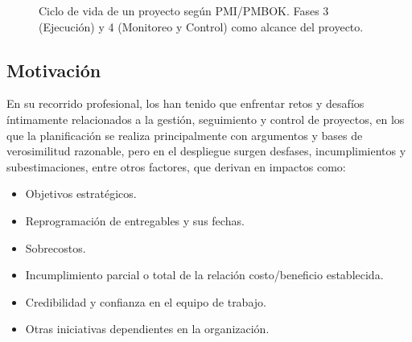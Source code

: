 \documentclass[12pt]
{charter}
\begin{document}
\begin{figure}[h]
  \centering


  \caption{Ciclo de vida de un proyecto según PMI/PMBOK. Fases 3 (Ejecución) y 4 (Monitoreo y Control) como alcance del proyecto.}
  \label{fig:ciclo-pmi}
\end{figure}

\subsection{Motivación}

En su recorrido profesional, los  han tenido que enfrentar retos y desafíos íntimamente relacionados a la gestión, seguimiento y control de proyectos, en los que la planificación se realiza  principalmente con argumentos y bases de verosimilitud razonable, pero en el despliegue surgen desfases, incumplimientos y subestimaciones, entre otros factores, que derivan en impactos como:

\begin{itemize}
	\item Objetivos estratégicos.
	\item Reprogramación de entregables y sus fechas.
	\item Sobrecostos.
	\item Incumplimiento parcial o total de la relación costo/beneficio establecida.
	\item Credibilidad y confianza en el equipo de trabajo.
	\item Otras iniciativas dependientes en la organización.
\end{itemize}
\end{document}
